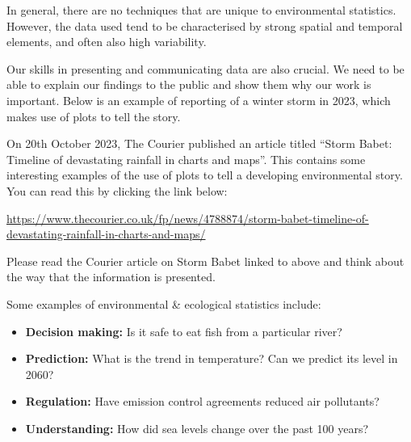\documentclass[
  letterpaper,
  DIV=11,
  numbers=noendperiod]{scrartcl}
\providecommand{\tightlist}{%
  \setlength{\itemsep}{0pt}\setlength{\parskip}{0pt}}\usepackage{longtable,booktabs,array}
\begin{document}
In general, there are no techniques that are unique to environmental
statistics. However, the data used tend to be characterised by strong
spatial and temporal elements, and often also high variability.

Our skills in presenting and communicating data are also crucial. We
need to be able to explain our findings to the public and show them why
our work is important. Below is an example of reporting of a winter
storm in 2023, which makes use of plots to tell the story.

\begin{tcolorbox}[enhanced jigsaw, coltitle=black, colframe=quarto-callout-note-color-frame, bottomrule=.15mm, leftrule=.75mm, toptitle=1mm, titlerule=0mm, title={The Courier article on Storm Babet}, bottomtitle=1mm, toprule=.15mm, rightrule=.15mm, arc=.35mm, opacityback=0, opacitybacktitle=0.6, left=2mm, colbacktitle=quarto-callout-note-color!10!white, breakable, colback=white]

On 20th October 2023, The Courier published an article titled ``Storm
Babet: Timeline of devastating rainfall in charts and maps''. This
contains some interesting examples of the use of plots to tell a
developing environmental story. You can read this by clicking the link
below:

\url{https://www.thecourier.co.uk/fp/news/4788874/storm-babet-timeline-of-devastating-rainfall-in-charts-and-maps/}

\end{tcolorbox}

\begin{tcolorbox}[enhanced jigsaw, coltitle=black, colframe=quarto-callout-tip-color-frame, bottomrule=.15mm, leftrule=.75mm, toptitle=1mm, titlerule=0mm, title={Exercise 3}, bottomtitle=1mm, toprule=.15mm, rightrule=.15mm, arc=.35mm, opacityback=0, opacitybacktitle=0.6, left=2mm, colbacktitle=quarto-callout-tip-color!10!white, breakable, colback=white]

Please read the Courier article on Storm Babet linked to above and think
about the way that the information is presented.

\end{tcolorbox}

Some examples of environmental \& ecological statistics include:

\begin{itemize}
\tightlist
\item
  \textbf{Decision making:} Is it safe to eat fish from a particular
  river?
\item
  \textbf{Prediction:} What is the trend in temperature? Can we predict
  its level in 2060?
\item
  \textbf{Regulation:} Have emission control agreements reduced air
  pollutants?
\item
  \textbf{Understanding:} How did sea levels change over the past 100
  years?
\end{itemize}
\end{document}
